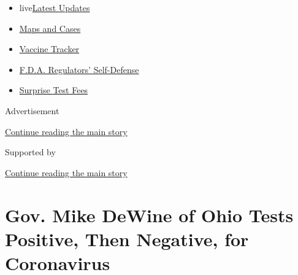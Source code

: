 \begin{itemize}
\tightlist
\item
  live\href{https://www.nytimes3xbfgragh.onion/2020/09/11/world/covid-19-coronavirus.html?name=styln-coronavirus-national\&region=TOP_BANNER\&block=storyline_menu_recirc\&action=click\&pgtype=Article\&impression_id=d1208d41-f4b9-11ea-b11b-3733e3cfd085\&variant=undefined}{Latest
  Updates}
\item
  \href{https://www.nytimes3xbfgragh.onion/interactive/2020/us/coronavirus-us-cases.html?name=styln-coronavirus-national\&region=TOP_BANNER\&block=storyline_menu_recirc\&action=click\&pgtype=Article\&impression_id=d1208d42-f4b9-11ea-b11b-3733e3cfd085\&variant=undefined}{Maps
  and Cases}
\item
  \href{https://www.nytimes3xbfgragh.onion/interactive/2020/science/coronavirus-vaccine-tracker.html?name=styln-coronavirus-national\&region=TOP_BANNER\&block=storyline_menu_recirc\&action=click\&pgtype=Article\&impression_id=d1208d43-f4b9-11ea-b11b-3733e3cfd085\&variant=undefined}{Vaccine
  Tracker}
\item
  \href{https://www.nytimes3xbfgragh.onion/2020/09/10/us/politics/fda-coronavirus-vaccine.html?name=styln-coronavirus-national\&region=TOP_BANNER\&block=storyline_menu_recirc\&action=click\&pgtype=Article\&impression_id=d1208d44-f4b9-11ea-b11b-3733e3cfd085\&variant=undefined}{F.D.A.
  Regulators' Self-Defense}
\item
  \href{https://www.nytimes3xbfgragh.onion/2020/09/09/upshot/coronavirus-surprise-test-fees.html?name=styln-coronavirus-national\&region=TOP_BANNER\&block=storyline_menu_recirc\&action=click\&pgtype=Article\&impression_id=d120b450-f4b9-11ea-b11b-3733e3cfd085\&variant=undefined}{Surprise
  Test Fees}
\end{itemize}

Advertisement

\protect\hyperlink{after-top}{Continue reading the main story}

Supported by

\protect\hyperlink{after-sponsor}{Continue reading the main story}

\hypertarget{gov-mike-dewine-of-ohio-tests-positive-then-negative-for-coronavirus}{%
\section{Gov. Mike DeWine of Ohio Tests Positive, Then Negative, for
Coronavirus}\label{gov-mike-dewine-of-ohio-tests-positive-then-negative-for-coronavirus}}

